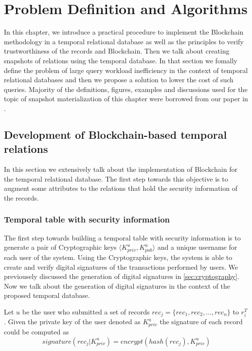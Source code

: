 \chapter{Problem Definition and Algorithms} \label{ch:algorithms}
	In this chapter, we introduce a practical procedure to implement the Blockchain methodology in a temporal relational database as well as the principles to verify trustworthiness of the records and Blockchain. Then we talk about creating snapshots of relations using the temporal database. In that section we fomally define the problem of large query workload inefficiency in the context of temporal relational databases and then we propose a solution to lower the cost of such queries. Majority of the definitions, figures, examples and discussions used for the topic of snapshot materialization of this chapter were borrowed from our paper in \cite{beirami2018snapshot}.

	\section{Development of Blockchain-based temporal relations} \label{sec:temporal_blockchain}
		In this section we extensively talk about the implementation of Blockchain for the temporal relational database. The first step towards this objective is to augment some attributes to the relations that hold the security information of the records.

		\subsection{Temporal table with security information} \label{sec:temporal_with_security}
		The first step towards building a temporal table with security information is to generate a pair of Cryptographic keys $\langle K_{priv}^u, K_{pub}^u \rangle$ and a unique username for each user of the system. Using the Cryptographic keys, the system is able to create and verify digital signatures of the transactions performed by users. We previousely discussed the generation of digital signatures in \ref{sec:cryptography}. Now we talk about the generation of digital signatures in the context of the proposed temporal database.

			\begin{defn} 
				Let $u$ be the user who submitted a set of records $rec_j =\{rec_1,rec_2,...,rec_n\}$ to $r_i^T$. Given the private key of the user denoted as $K_{priv}^u$ the signature of each record could be computed as $$signature(rec_j|K_{priv}^u)= encrypt(hash(rec_j),K_{priv}^u)$$  
			\label{defn:digital_signature}
			\end{defn}

